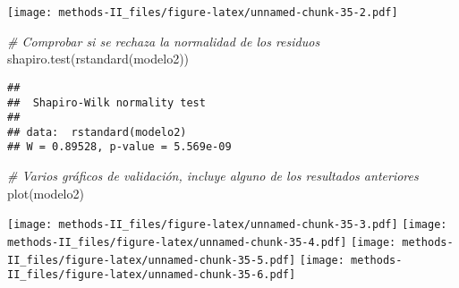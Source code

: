 \documentclass[
]{article}
\newenvironment{Shaded}{\begin{snugshade}}{\end{snugshade}}
\newcommand{\AttributeTok}[1]{\textcolor[rgb]{0.77,0.63,0.00}{#1}}
\newcommand{\CommentTok}[1]{\textcolor[rgb]{0.56,0.35,0.01}{\textit{#1}}}
\newcommand{\DecValTok}[1]{\textcolor[rgb]{0.00,0.00,0.81}{#1}}
\newcommand{\FunctionTok}[1]{\textcolor[rgb]{0.00,0.00,0.00}{#1}}
\newcommand{\NormalTok}[1]{#1}
\newcommand{\SpecialCharTok}[1]{\textcolor[rgb]{0.00,0.00,0.00}{#1}}
\begin{document}
\texttt{[image: methods-II\_files/figure-latex/unnamed-chunk-35-2.pdf]}

\begin{Shaded}
\begin{Highlighting}[]
\CommentTok{\# Comprobar si se rechaza la normalidad de los residuos}
\FunctionTok{shapiro.test}\NormalTok{(}\FunctionTok{rstandard}\NormalTok{(modelo2))}
\end{Highlighting}
\end{Shaded}

\begin{verbatim}
## 
##  Shapiro-Wilk normality test
## 
## data:  rstandard(modelo2)
## W = 0.89528, p-value = 5.569e-09
\end{verbatim}

\begin{Shaded}
\begin{Highlighting}[]
\CommentTok{\# Varios gráficos de validación, incluye alguno de los resultados anteriores}
\FunctionTok{plot}\NormalTok{(modelo2)}
\end{Highlighting}
\end{Shaded}

\texttt{[image: methods-II\_files/figure-latex/unnamed-chunk-35-3.pdf]}
\texttt{[image: methods-II\_files/figure-latex/unnamed-chunk-35-4.pdf]}
\texttt{[image: methods-II\_files/figure-latex/unnamed-chunk-35-5.pdf]}
\texttt{[image: methods-II\_files/figure-latex/unnamed-chunk-35-6.pdf]}

\begin{Shaded}
\end{Shaded}
\end{document}
